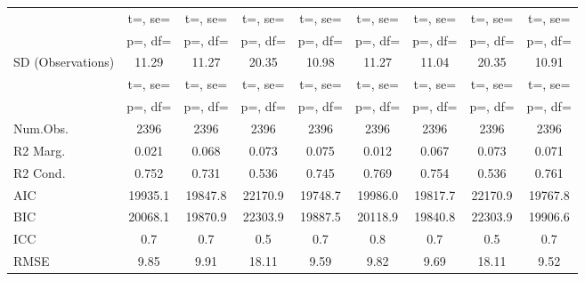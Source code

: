 \documentclass[]{report}
\begin{document}
\begin{table}
{\begin{tabular}[t]{lcccccccc}
		& t=, se= & t=, se= & t=, se= & t=, se= & t=, se= & t=, se= & t=, se= & t=, \vphantom{1} se=\\
		& p=, df= & p=, df= & p=, df= & p=, df= & p=, df= & p=, df= & p=, df= & p=, \vphantom{1} df=\\
		SD (Observations) & \num{11.29} & \num{11.27} & \num{20.35} & \num{10.98} & \num{11.27} & \num{11.04} & \num{20.35} & \num{10.91}\\
		& t=, se= & t=, se= & t=, se= & t=, se= & t=, se= & t=, se= & t=, se= & t=, se=\\
		& p=, df= & p=, df= & p=, df= & p=, df= & p=, df= & p=, df= & p=, df= & p=, df=\\
		\midrule
		Num.Obs. & \num{2396} & \num{2396} & \num{2396} & \num{2396} & \num{2396} & \num{2396} & \num{2396} & \num{2396}\\
		R2 Marg. & \num{0.021} & \num{0.068} & \num{0.073} & \num{0.075} & \num{0.012} & \num{0.067} & \num{0.073} & \num{0.071}\\
		R2 Cond. & \num{0.752} & \num{0.731} & \num{0.536} & \num{0.745} & \num{0.769} & \num{0.754} & \num{0.536} & \num{0.761}\\
		AIC & \num{19935.1} & \num{19847.8} & \num{22170.9} & \num{19748.7} & \num{19986.0} & \num{19817.7} & \num{22170.9} & \num{19767.8}\\
		BIC & \num{20068.1} & \num{19870.9} & \num{22303.9} & \num{19887.5} & \num{20118.9} & \num{19840.8} & \num{22303.9} & \num{19906.6}\\
		ICC & \num{0.7} & \num{0.7} & \num{0.5} & \num{0.7} & \num{0.8} & \num{0.7} & \num{0.5} & \num{0.7}\\
		RMSE & \num{9.85} & \num{9.91} & \num{18.11} & \num{9.59} & \num{9.82} & \num{9.69} & \num{18.11} & \num{9.52}\\
		\bottomrule
	\end{tabular}}
\end{table}
\end{document}
